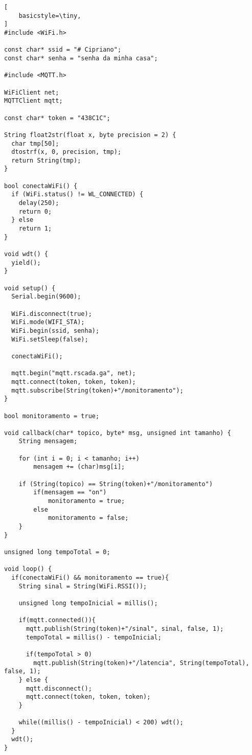 \label{ap:apendice-wifi}

\begin{lstlisting}[
    basicstyle=\tiny,
]
#include <WiFi.h>

const char* ssid = "# Cipriano";
const char* senha = "senha da minha casa";

#include <MQTT.h>

WiFiClient net;
MQTTClient mqtt;

const char* token = "438C1C";

String float2str(float x, byte precision = 2) {
  char tmp[50];
  dtostrf(x, 0, precision, tmp);
  return String(tmp);
}

bool conectaWiFi() {
  if (WiFi.status() != WL_CONNECTED) {
    delay(250);
    return 0;
  } else
    return 1;
}

void wdt() {
  yield();
}

void setup() {
  Serial.begin(9600);

  WiFi.disconnect(true);
  WiFi.mode(WIFI_STA);
  WiFi.begin(ssid, senha);
  WiFi.setSleep(false);
  
  conectaWiFi();
    
  mqtt.begin("mqtt.rscada.ga", net);
  mqtt.connect(token, token, token);
  mqtt.subscribe(String(token)+"/monitoramento");
}

bool monitoramento = true;

void callback(char* topico, byte* msg, unsigned int tamanho) {
    String mensagem;
  
	for (int i = 0; i < tamanho; i++)
		mensagem += (char)msg[i];

	if (String(topico) == String(token)+"/monitoramento")
		if(mensagem == "on")
			monitoramento = true;
		else
			monitoramento = false;
  	}
}

unsigned long tempoTotal = 0;
  
void loop() {
  if(conectaWiFi() && monitoramento == true){
    String sinal = String(WiFi.RSSI());

    unsigned long tempoInicial = millis();    

    if(mqtt.connected()){
      mqtt.publish(String(token)+"/sinal", sinal, false, 1);
      tempoTotal = millis() - tempoInicial;

      if(tempoTotal > 0)
        mqtt.publish(String(token)+"/latencia", String(tempoTotal), false, 1);
    } else {
      mqtt.disconnect();
      mqtt.connect(token, token, token);
    }

    while((millis() - tempoInicial) < 200) wdt();
  }
  wdt();
}
\end{lstlisting}